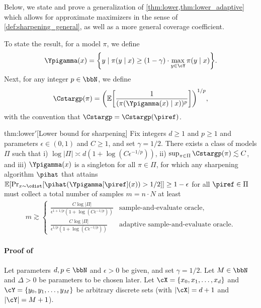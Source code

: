 



Below, we state and prove a generalization of \cref{thm:lower,thm:lower_adaptive} which allows for approximate maximizers in the sense of \cref{def:sharpening_general}, as well as a more general coverage coefficient.

To state the result, for a model $\pi$, we define
\begin{align}
\Ypigamma(x) = \crl*{y\mid{}
  \pi(y\mid{}x)\geq{}(1-\gamma)\cdot\max_{y\in\cY}\pi(y\mid
                                                         x)}.
\end{align}
Next, for any integer $p\in\bbN$, we define 
\begin{align}\Cstargp(\pi) = \prn*{\En\brk*{
    \frac{1}{(\pi(\Ypigamma(x)\mid{}x))^p
  }}}^{1/p},
  \end{align} 
  with the convention that $\Cstargp = \Cstargp(\piref)$. 
\begin{thmmod}{thm:lower}{$'$}[Lower bound for sharpening]
  \label{thm:lower_general}
  Fix integers $d \ge 1$ and $p \ge 1$ and parameters   $\epsilon \in
  (0,1)$ and $C \ge 1$, and set $\gamma = 1/2$.  There exists a class
  of models $\Pi$ such that i) $\log |\Pi| \asymp d (1+\log(C
  \epsilon^{-1/p}))$, ii) $\sup_{\pi \in \Pi} \Cstargp(\pi) \lesssim
  C$, and iii) $\Ypigamma(x)$ is a singleton for all $\pi\in\Pi$, for
  which any sharpening algorithm $\pihat$ that attains $\En\brk*{\Pr_{x \sim
    \cdist}[\pihat(\Ypigamma[\piref](x)) > 1/2]}  \ge 1 - \epsilon$ for
  all $\piref \in \Pi$ must collect a total number of samples $m = n\cdot{}N$ at least
\begin{align}
  m \gtrsim \begin{cases}
    \frac{ C\log |\Pi|}{\epsilon^{1+1/p} (1+\log(C \epsilon^{-1/p}))}
    & \text{sample-and-evaluate oracle},\\
    \frac{ C\log |\Pi|}{\epsilon^{1/p} (1+\log(C \epsilon^{-1/p}))}  &
    \text{adaptive sample-and-evaluate oracle}.
    \end{cases}
\end{align}
\end{thmmod}
\paragraph{Proof of }%
  \newcommand{\Enki}{\En^{\cI}}%
\newcommand{\Pnki}{\Pr^{\cI}}%
\newcommand{\EnI}{\En_{\cI \sim \texttt{Unif}}}%
Let parameters $d, p \in \bbN$ and $\epsilon > 0$ be given, and set
$\gamma=1/2$. Let $M\in\bbN$ and $\Delta>0$ be parameters to be chosen
later. Let $\cX = \{x_0,x_1,\dots,x_d\}$ and $\cY =
\{y_0,y_1,\dots,y_M\}$ be arbitrary discrete sets (with
$\abs{\cX}=d+1$ and $\abs{\cY}=M+1$).


